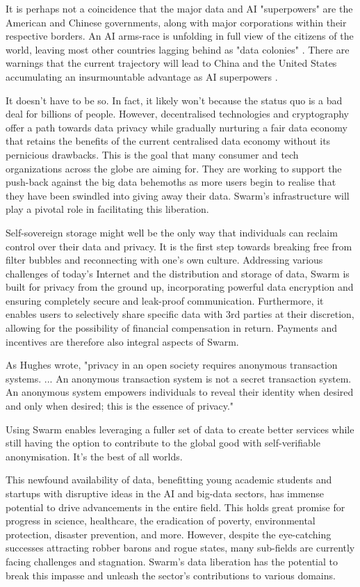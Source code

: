 It is perhaps not a coincidence that the major data and AI "superpowers" are the American and Chinese governments, along with major corporations within their respective borders. An AI arms-race is unfolding in full view of the citizens of the world,  leaving most other countries lagging behind as "data colonies" \cite{HarariDavos2020Mar}. There are warnings that the current trajectory will lead to China and the United States accumulating an insurmountable advantage as AI superpowers \cite{Lee2018Sep}.

It doesn't have to be so. In fact, it likely won't because the status quo is a bad deal for billions of people. However, decentralised technologies and cryptography offer a path towards data privacy while gradually nurturing a fair data economy that retains the benefits of the current centralised data economy without its pernicious drawbacks. This is the goal that many consumer and tech organizations across the globe are aiming for. They are working to support the push-back against the big data behemoths as more users begin to realise that they have been swindled into giving away their data. Swarm's infrastructure will play a pivotal role in facilitating this liberation.

Self-sovereign storage might well be the only way that individuals can reclaim control over their data and privacy. It is the first step towards breaking free from filter bubbles and reconnecting with one's own culture. Addressing various challenges of today's Internet and the distribution and storage of data, Swarm is built for privacy from the ground up, incorporating powerful data encryption and ensuring completely secure and leak-proof communication. Furthermore, it enables users to selectively share specific data with 3rd parties at their discretion, allowing for the possibility of financial compensation in return. Payments and incentives are therefore also integral aspects of Swarm.

As Hughes wrote, "privacy in an open society requires anonymous transaction systems. ... An anonymous transaction system is not a secret transaction system. An anonymous system empowers individuals to reveal their identity when desired and only when desired; this is the essence of privacy."

Using Swarm enables leveraging a fuller set of data to create better services while still having the option to contribute to the global good with self-verifiable anonymisation. It's the best of all worlds.

This newfound availability of data, benefitting young academic students and startups with disruptive ideas in the AI and big-data sectors, has immense potential to drive advancements in the entire field. This holds great promise for progress in science, healthcare, the eradication of poverty, environmental protection, disaster prevention, and more. However, despite the eye-catching successes attracting robber barons and rogue states, many sub-fields are currently facing challenges and stagnation. Swarm's data liberation has the potential to break this impasse  and unleash the sector's contributions to various domains. 

